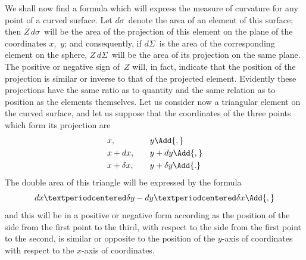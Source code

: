 
We shall now find a formula which will express the measure of curvature for
any point of a curved surface. Let $d\sigma$~denote the area of an element of this surface;
then $Z\, d\sigma$~will be the area of the projection of this element on the plane of the coordinates
$x$,~$y$; and consequently, if $d\Sigma$~is the area of the corresponding element on the
sphere, $Z\, d\Sigma$~will be the area of its projection on the same plane. The positive or
negative sign of~$Z$ will, in fact, indicate that the position of the projection is similar or
inverse to that of the projected element. Evidently these projections have the same
ratio as to quantity and the same relation as to position as the elements themselves.
Let us consider now a triangular element on the curved surface, and let us suppose
that the coordinates of the three points which form its projection are
\begin{alignat*}{3}
&x,           && y\Add{,} \\
&x + dx,\quad && y + dy\Add{,} \\
&x + \delta x,\quad && y + \delta y\Add{.}
\end{alignat*}
The double area of this triangle will be expressed by the formula
\[
dx·\delta y - dy·\delta x\Add{,}
\]
and this will be in a positive or negative form according as the position of the side
from the first point to the third, with respect to the side from the first point to the
second, is similar or opposite to the position of the $y$-axis of coordinates with respect
to the $x$-axis of coordinates.

